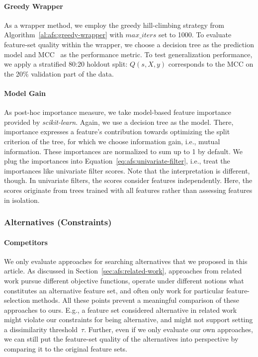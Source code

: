 \documentclass{article}
\theoremstyle{definition}
\begin{document}
\paragraph{Greedy Wrapper}

As a wrapper method, we employ the greedy hill-climbing strategy from Algorithm~\ref{al:afs:greedy-wrapper} with $max\_iters$ set to 1000.
To evaluate feature-set quality within the wrapper, we choose a decision tree as the prediction model and MCC~\cite{matthews1975comparison} as the performance metric.
To test generalization performance, we apply a stratified 80:20 holdout split:
$Q(s,X,y)$ corresponds to the MCC on the 20\% validation part of the data.

\paragraph{Model Gain}

As post-hoc importance measure, we take model-based feature importance provided by \emph{scikit-learn}.
Again, we use a decision tree as the model.
There, importance expresses a feature's contribution towards optimizing the split criterion of the tree, for which we choose information gain, i.e., mutual information.
These importances are normalized to sum up to 1 by default.
We plug the importances into Equation~\ref{eq:afs:univariate-filter}, i.e., treat the importances like univariate filter scores.
Note that the interpretation is different, though.
In univariate filters, the scores consider features independently.
Here, the scores originate from trees trained with all features rather than assessing features in isolation.

\subsubsection{Alternatives (Constraints)}
\label{sec:afs:experimental-design:approaches:alternatives}

\paragraph{Competitors}

We only evaluate approaches for searching alternatives that we proposed in this article.
As discussed in Section~\ref{sec:afs:related-work}, approaches from related work pursue different objective functions, operate under different notions what constitutes an alternative feature set, and often only work for particular feature-selection methods.
All these points prevent a meaningful comparison of these approaches to ours.
E.g., a feature set considered alternative in related work might violate our constraints for being alternative, and might not support setting a dissimilarity threshold~$\tau$.
Further, even if we only evaluate our own approaches, we can still put the feature-set quality of the alternatives into perspective by comparing it to the original feature sets.
\end{document}
